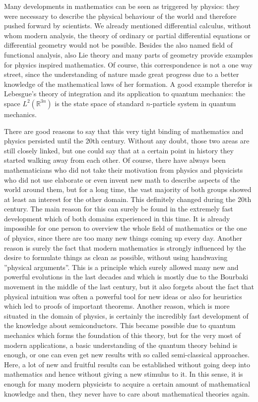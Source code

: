 Many developments in mathematics can be seen as triggered by physics: they were 
necessary to describe the physical behaviour of the world and therefore pushed 
forward by scientists. We already mentioned differential calculus, without 
whom modern analysis, the theory of ordinary or partial differential equations 
or differential geometry would not be possible. Besides the also named field of 
functional analysis, also Lie theory and many parts of geometry provide 
examples for physics inspired mathematics. Of course, this correspondence is 
not a one way street, since the understanding of nature made great progress due 
to a better knowledge of the mathematical laws of her formation. A good example 
therefor is Lebesgue's theory of integration and its application to quantum 
mechanics: the space $L^2(\mathbb{R}^{3n})$ is the state space of standard 
$n$-particle system in quantum mechanics.


There are good reasons to say that this very tight binding of mathematics and 
physics persisted until the 20th century. Without any doubt, those two areas 
are still closely linked, but one could say that at a certain point in history 
they started walking away from each other. Of course, there have always been 
mathematicians who did not take their motivation from physics and physicists 
who did not use elaborate or even invent new math to describe aspects of the 
world around them, but for a long time, the vast majority of both groups showed 
at least an interest for the other domain. This definitely changed during the 
20th century. The main reason for this can surely be found in the extremely 
fast development which of both domains experienced in this time. It is already 
impossible for one person to overview the whole field of mathematics or the one 
of physics, since there are too many new things coming up every day. Another 
reason is surely the fact that modern mathematics is strongly influenced by the 
desire to formulate things as clean as possible, without using handwaving 
''physical arguments''. This is a principle which surely allowed many new and 
powerful evolutions in the last decades and which is mostly due to the Bourbaki 
movement in the middle of the last century, but it also forgets about the fact 
that physical intuition was often a powerful tool for new ideas or also for 
heuristics which led to proofs of important theorems. Another reason, which is 
more situated in the domain of physics, is certainly the incredibly fast 
development of the knowledge about semiconductors. This became possible due to 
quantum mechanics which forms the foundation of this theory, but for the very 
most of modern applications, a basic understanding of the quantum theory behind 
is enough, or one can even get new results with so called semi-classical 
approaches. Here, a lot of new and fruitful results can be established without 
going deep into mathematics and hence without giving a new stimulus to it. In 
this sense, it is enough for many modern physicists to acquire a certain amount 
of mathematical knowledge and then, they never have to care about mathematical 
theories again.


